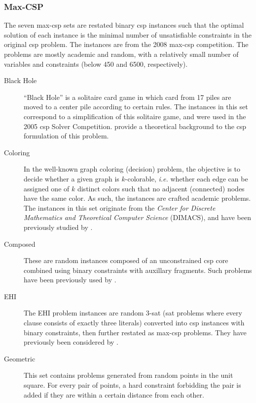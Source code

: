 \subsubsection{Max-CSP}
The seven max-\gls{csp} sets are restated binary \gls{csp} instances such that the optimal solution of each instance is the minimal number of unsatisfiable constraints in the original \gls{csp} problem.
The instances are from the 2008 max-\gls{csp} competition.
The problems are mostly academic and random, with a relatively small number of variables and constraints (below \num{450} and \num{6500}, respectively).

\begin{description}
	\item[Black Hole]
		\enquote{Black Hole} is a solitaire card game in which card from 17 piles are moved to a center pile according to certain rules.
		The instances in this set correspond to a simplification of this solitaire game, and were used in the 2005 \gls{csp} Solver Competition.
		\Textcite{Gent07} provide a theoretical background to the \gls{csp} formulation of this problem.
	\item[Coloring]
		In the well-known graph coloring (decision) problem, the objective is to decide whether a given graph is \(k\)-colorable, \emph{i.e.} whether each edge can be assigned one of \(k\) distinct colors such that no adjacent (connected) nodes have the same color.
		As such, the instances are crafted academic problems.
		The instances in this set originate from the \emph{Center for Discrete Mathematics and Theoretical Computer Science} (DIMACS), and have been previously studied by \textcite{Benhamou07}.
	\item[Composed]
		These are random instances composed of an unconstrained \gls{csp} core combined using binary constraints with auxillary fragments.
		Such problems have been previously used by \textcite{Lecoutre04,Jussien00}.
	\item[EHI]
		The EHI problem instances are random 3-\gls{sat} (\gls{sat} problems where every clause consists of exactly three literals) converted into \gls{csp} instances with binary constraints, then further restated as max-\gls{csp} problems. They have previously been considered by \textcite{Lecoutre04}.
	\item[Geometric]
		This set contains problems generated from random points in the unit square. For every pair of points, a hard constraint forbidding the pair is added if they are within a certain distance from each other.

\end{description}
